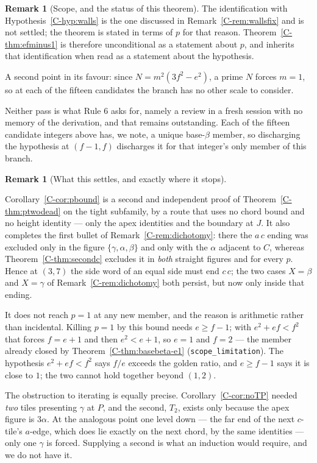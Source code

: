 \documentclass[11pt,reqno]{amsart}
\theoremstyle{plain}
\theoremstyle{definition}
\newtheorem{remark}[theorem]{Remark}
\begin{document}
\begin{remark}[Scope, and the status of this theorem]
The identification with Hypothesis~\ref{C-hyp:walls} is the one discussed in
Remark~\ref{C-rem:wallsfix} and is not settled; the theorem is stated in terms of $p$ for that reason. Theorem~\ref{C-thm:efminus1} is therefore unconditional as a statement about $p$, and
inherits that identification when read as a statement about the hypothesis.

A second point in its favour: since $N=m^{2}(3f^{2}-e^{2})$, a prime $N$ forces $m=1$, so at each of
the fifteen candidates the branch has no other scale to consider.

Neither pass is what Rule 6 asks for, namely a review in a fresh session with no memory of the
derivation, and that remains outstanding. Each of the fifteen candidate integers above has, we note, a
unique base-$\beta$ member, so discharging the hypothesis at $(f-1,f)$ discharges it for that
integer's only member of this branch.
\end{remark}

\begin{remark}[What this settles, and exactly where it stops]\label{O-apexscope}

Corollary~\ref{C-cor:pbound} is a second and independent proof of Theorem~\ref{C-thm:ptwodead} on the
tight subfamily, by a route that uses no chord bound and no height identity --- only the apex
identities and the boundary at $J$. It also completes the first bullet of
Remark~\ref{C-rem:dichotomy}: there the $a\,c$ ending was excluded only in the figure
$\{\gamma,\alpha,\beta\}$ and only with the $\alpha$ adjacent to $C$, whereas
Theorem~\ref{C-thm:secondc} excludes it in \emph{both} straight figures and for every $p$. Hence at
$(3,7)$ the side word of an equal side must end $c\,c$; the two cases $X=\beta$ and $X=\gamma$ of
Remark~\ref{C-rem:dichotomy} both persist, but now only inside that ending.

It does not reach $p=1$ at any new member, and the reason is arithmetic rather than incidental.
Killing $p=1$ by this bound needs $e\ge f-1$; with $e^{2}+ef<f^{2}$ that forces $f=e+1$ and then
$e^{2}<e+1$, so $e=1$ and $f=2$ --- the member already closed by
Theorem~\ref{C-thm:basebeta-e1} (\texttt{scope\_limitation}). The hypothesis $e^{2}+ef<f^{2}$ says
$f/e$ exceeds the golden ratio, and $e\ge f-1$ says it is close to $1$; the two cannot hold together
beyond $(1,2)$.

The obstruction to iterating is equally precise. Corollary~\ref{C-cor:noTP} needed \emph{two} tiles
presenting $\gamma$ at $P$, and the second, $T_2$, exists only because the apex figure is $3\alpha$.
At the analogous point one level down --- the far end of the next $c$-tile's $a$-edge, which does lie
exactly on the next chord, by the same identities --- only one $\gamma$ is forced. Supplying a second
is what an induction would require, and we do not have it.
\end{remark}
\end{document}

